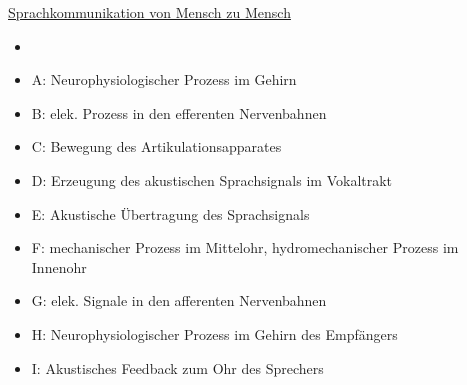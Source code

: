 \documentclass[a4paper,10pt,oneside]{article}
\begin{document}
\underline{Sprachkommunikation von Mensch zu Mensch} \\
	\begin{itemize}
		\item[] %
		\item A: Neurophysiologischer Prozess im Gehirn
		\item B: elek. Prozess in den efferenten Nervenbahnen
		\item C: Bewegung des Artikulationsapparates
		\item D: Erzeugung des akustischen Sprachsignals im Vokaltrakt
		\item E: Akustische Übertragung des Sprachsignals
		\item F: mechanischer Prozess im Mittelohr, hydromechanischer Prozess im Innenohr
		\item G: elek. Signale in den afferenten Nervenbahnen
		\item H: Neurophysiologischer Prozess im Gehirn des Empfängers
		\item I: Akustisches Feedback zum Ohr des Sprechers
	\end{itemize}
	
\end{document}
